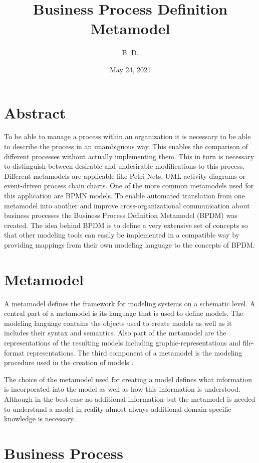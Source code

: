 \documentclass[a4paper,11pt]{article}
\title{Business Process Definition Metamodel}
\author{B. D.}
\date{May 24, 2021}
\begin{document}
\maketitle

\section{Abstract}
To be able to manage a process within an organization it is necessary to be
able to describe the process in an unambiguous way. This enables the
comparison of different processes without actually implementing them. This in
turn is necessary to distinguish between desirable and undesirable
modifications to this process. Different metamodels are applicable like Petri
Nets, UML-activity diagrams or event-driven process chain charts. One of the
more common metamodels used for this application are BPMN models. To enable
automated translation from one metamodel into another and improve
cross-organizational communication about business processes the Business
Process Definition Metamodel (BPDM) was created. The idea behind BPDM is to
define a very extensive set of concepts so that other modeling tools can
easily be implemented in a compatible way by providing mappings from their own
modeling language to the concepts of BPDM.

\section{Metamodel}
A metamodel defines the framework for modeling systems on a schematic level. A
central part of a metamodel is its language that is used to define models. The
modeling language contains the objects used to create models as well as it
includes their syntax and semantics.  Also part of the metamodel are the
representations of the resulting models including graphic-representations and
file-format representations.  The third component of a metamodel is the
modeling procedure used in the creation of models \cite{alfwi}.

The choice of the metamodel used for creating a model defines what information
is incorporated into the model as well as how this information is
understood. Although in the best case no additional information but the
metamodel is needed to understand a model in reality almost always additional
domain-specific knowledge is necessary.

\section{Business Process} 
\end{document}

